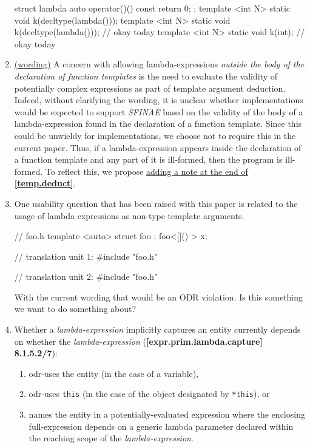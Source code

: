 \documentclass{wg21}
\newcommand{\cc}[1]{\texttt{#1}}
\begin{document}
\begin{enumerate}
\begin{cpp}
struct lambda { auto operator()() const { return 0; } };
template <int N> static void k(decltype(lambda{}()));
template <int N> static void k(decltype(lambda{}())); // okay today
template <int N> static void k(int);                  // okay today
\end{cpp}


  \item \label{discussion.sfinae}
    \hyperref[wording.sfinae]{(wording)}
    A concern with allowing lambda-expressions \textit{outside the body of
    the declaration of function templates} is the need to evaluate the validity
    of potentially complex expressions as part of template argument deduction.
    Indeed, without clarifying the wording, it is unclear whether implementations
    would be expected to support \textit{SFINAE} based on the validity of
    the body of a lambda-expression found in the declaration of a function
    template. Since this could be unwieldy for implementations, we choose not
    to require this in the current paper. Thus, if a lambda-expression appears
    inside the declaration of a function template and any part of it is ill-formed,
    then the program is ill-formed. To reflect this, we propose
    \hyperref[wording.sfinae]{adding a note at the end of \textbf{[temp.deduct]}}.


  \item \label{discussion.nontype}
    One usability question that has been raised with this paper is related
    to the usage of lambda expressions as non-type template arguments.

\begin{cpp}
// foo.h
template <auto> struct foo { };
foo<[]() {}> x;

// translation unit 1:
#include "foo.h"

// translation unit 2:
#include "foo.h"
\end{cpp}

    With the current wording that would be an ODR violation. Is this something
    we want to do something about?


  \item \label{discussion.capture}
    Whether a \textit{lambda-expression} implicitly captures an entity
    currently depends on whether the \textit{lambda-expression}
    (\textbf{[expr.prim.lambda.capture] 8.1.5.2/7}):
    \begin{enumerate}
      \item odr-uses the entity (in the case of a variable),
      \item odr-uses \cc{this} (in the case of the object designated by \cc{*this}), or
      \item names the entity in a potentially-evaluated expression where the
            enclosing full-expression depends on a generic lambda parameter
            declared within the reaching scope of the \textit{lambda-expression}.
    \end{enumerate}


\end{enumerate}
\end{document}
